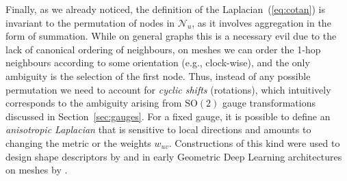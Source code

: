Finally, as we already noticed, the definition of the Laplacian~(\ref{eq:cotan}) is invariant to the permutation of nodes in $\mathcal{N}_u$, as it involves aggregation in the form of summation. 
%
While on general graphs this is a necessary evil due to the lack of canonical ordering of neighbours, on meshes we can order the 1-hop neighbours according to some orientation (e.g., clock-wise), and the only ambiguity is the selection of the first node. Thus, instead of any possible permutation we need to account for {\em cyclic shifts} (rotations), which intuitively corresponds to the ambiguity arising from $\mathrm{SO}(2)$ gauge transformations discussed in Section~\ref{sec:gauges}. 
%
For a fixed gauge, it is possible to define an {\em anisotropic Laplacian} that is sensitive to local directions and amounts to changing the metric or the weights $w_{uv}$. 
%
Constructions of this kind were used to design shape descriptors by \cite{andreux2014anisotropic,boscaini2016anisotropic} and in early Geometric Deep Learning architectures on meshes by \cite{boscaini2016learning}. 



